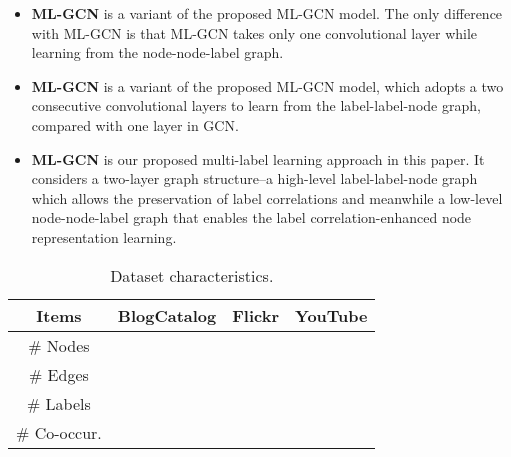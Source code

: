 \documentclass[conference]{IEEEtran}
\begin{document}
\begin{itemize}
    \item \textbf{ML-GCN} is a variant of the proposed ML-GCN model. The only difference with ML-GCN is that ML-GCN takes only one convolutional layer while learning from the node-node-label  graph.
    \item \textbf{ML-GCN} is a variant of the proposed ML-GCN model, which adopts a two consecutive convolutional layers to learn from the label-label-node graph, compared with one layer in GCN.
    \item \textbf{ML-GCN} is our proposed multi-label learning approach in this paper. It considers a two-layer graph structure--a high-level label-label-node graph which allows the preservation of label correlations and meanwhile a low-level node-node-label graph that enables the label correlation-enhanced node representation learning.
\end{itemize}

\begin{table}
\renewcommand{\arraystretch}{1.30}
\centering
\caption{Dataset characteristics.}
\label{tab:data}
    \begin{tabular}{c|c|c|c}
    \hline
    Items & BlogCatalog & Flickr & YouTube \\
    \hline
    \# Nodes &   &  &  \\
    \hline
    \# Edges &  &  &  \\
    \hline
    \# Labels &  &  &  \\
    \hline
    \# Co-occur. &  &  &  \\
    \hline
    \end{tabular}
\end{table}

\
\end{document}
